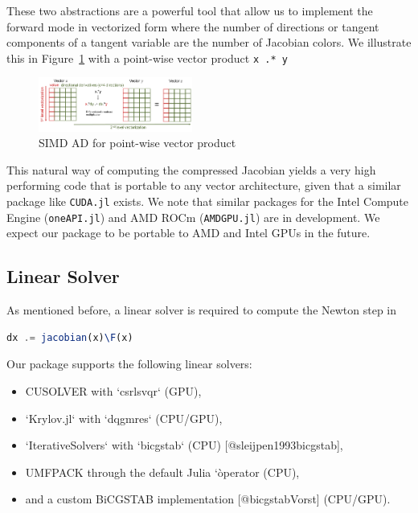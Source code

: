 \documentclass{juliacon}
\newcommand{\reffig}[1]{Figure~\ref{#1}}
\begin{document}
These two abstractions are a powerful tool that allow us to implement the
forward mode in vectorized form where the number of directions or tangent
components of a tangent variable are the number of Jacobian colors. We
illustrate this in \reffig{fig:simd} with a point-wise vector product \lstinline{x .* y}

\begin{figure}
    \includegraphics[width=0.45\textwidth]{figures/simd.png}
    \caption{SIMD AD for point-wise vector product}
    \label{fig:simd}
\end{figure}

This natural way of computing the compressed Jacobian yields a very high
performing code that is portable to any vector architecture, given that a
similar package like \lstinline{CUDA.jl} exists. We note that similar packages for the
Intel Compute Engine (\lstinline{oneAPI.jl}) and AMD ROCm (\lstinline{AMDGPU.jl}) are in development.
We expect our package to be portable to AMD and Intel GPUs in the future.

\subsection{Linear Solver}

As mentioned before, a linear solver is required to compute the Newton step in

\begin{lstlisting}[language = Julia]
dx .= jacobian(x)\F(x)
\end{lstlisting}

Our package supports the following linear solvers:

\begin{itemize}
    \item CUSOLVER with `csrlsvqr` (GPU),
    \item `Krylov.jl` with `dqgmres` (CPU/GPU),
    \item `IterativeSolvers` with `bicgstab` (CPU) [@sleijpen1993bicgstab],
    \item UMFPACK through the default Julia `\` operator (CPU),
    \item and a custom BiCGSTAB implementation [@bicgstabVorst] (CPU/GPU).
\end{itemize}
\end{document}
